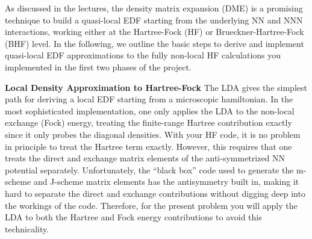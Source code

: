 As discussed in the lectures, the density matrix expansion (DME) is a promising technique to build a quasi-local EDF starting from the underlying NN and NNN interactions, working either at the Hartree-Fock (HF) or Brueckner-Hartree-Fock (BHF) level.  In the following, we outline the basic steps to derive and implement quasi-local EDF approximations to the fully non-local HF calculations you implemented in the first two phases of the project. 

{\bf Local Density Approximation to Hartree-Fock } The LDA gives the simplest path for deriving a local EDF starting from a microscopic hamiltonian. In the most sophisticated implementation, one only applies the LDA to the non-local exchange (Fock) energy, treating the finite-range Hartree contribution exactly since it only probes the diagonal densities.  With your HF code, it is no problem in principle to treat the Hartree term exactly. However, this requires that one treats the direct and exchange matrix elements of the anti-symmetrized NN potential separately.  Unfortunately, the ``black box'' code used to generate the m-scheme and J-scheme matrix elements has the antisymmetry built in, making it hard to separate the direct and exchange contributions without digging deep into the workings of the code. Therefore, for the present problem you will apply the LDA to both the Hartree and Fock energy contributions to avoid this technicality.

